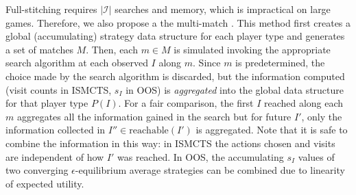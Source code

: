 \documentclass[letterpaper]{article}
\newcommand{\cI}{\mathcal{I}}
\newcommand{\defword}[1]{\textbf{\boldmath{#1}}}
\begin{document}
Full-stitching requires $|\cI|$ searches and memory, which is impractical on large games. 
Therefore, we also propose a the multi-match \defword{aggregate method}. 
This method first creates a global (accumulating) strategy data structure for each player type and generates a 
set of matches $M$. Then, each $m \in M$ is simulated invoking the appropriate search algorithm at each observed 
$I$ along $m$. 
Since $m$ is predetermined, the choice made by the search algorithm is discarded, but the information computed 
(visit counts in ISMCTS, $s_I$ in OOS) is {\it aggregated} into the global data structure for that player type 
$P(I)$. 
For a fair comparison, the first $I$ reached along each $m$ aggregates all the information gained in the search 
but for future $I'$, only the information collected in $I'' \in \mbox{reachable}(I')$ is aggregated.
Note that it is safe to combine the information in this way: in ISMCTS the actions chosen and visits are independent of 
how $I'$ was reached. In OOS, the accumulating $s_I$ values of two converging $\epsilon$-equilibrium average 
strategies can be combined due to linearity of expected utility. 

 
\end{document}
